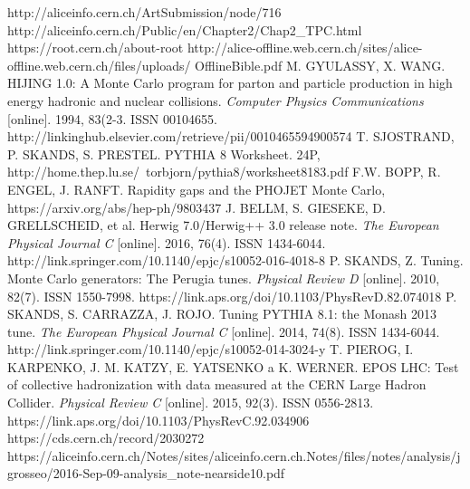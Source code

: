 \documentclass[thesismargins, thesislinespacing]{rnthesis}
\begin{document}
\begin{thebibliography}{}
http://aliceinfo.cern.ch/ArtSubmission/node/716
http://aliceinfo.cern.ch/Public/en/Chapter2/Chap2\_TPC.html
https://root.cern.ch/about-root 
http://alice-offline.web.cern.ch/sites/alice-offline.web.cern.ch/files/uploads/ \- OfflineBible.pdf
M. GYULASSY, X. WANG. HIJING 1.0: A Monte Carlo program for parton and particle production in high energy hadronic and nuclear collisions. \textit{Computer Physics Communications} [online]. 1994, 83(2-3. ISSN 00104655. http://linkinghub.elsevier.com/retrieve/pii/0010465594900574
T. SJOSTRAND, P. SKANDS, S. PRESTEL.  PYTHIA 8 Worksheet. 24P, http://home.thep.lu.se/~torbjorn/pythia8/worksheet8183.pdf
F.W. BOPP, R. ENGEL, J. RANFT.  Rapidity gaps and the PHOJET Monte Carlo, https://arxiv.org/abs/hep-ph/9803437
J. BELLM, S. GIESEKE, D. GRELLSCHEID, et al. Herwig 7.0/Herwig++ 3.0 release note. \textit{The European Physical Journal C} [online]. 2016, 76(4). ISSN 1434-6044. http://link.springer.com/10.1140/epjc/s10052-016-4018-8
P. SKANDS, Z. Tuning. Monte Carlo generators: The Perugia tunes. \textit{Physical Review D }[online]. 2010, 82(7). ISSN 1550-7998. https://link.aps.org/doi/10.1103/PhysRevD.82.074018
P. SKANDS, S. CARRAZZA, J. ROJO. Tuning PYTHIA 8.1: the Monash 2013 tune. \textit{The European Physical Journal C} [online]. 2014, 74(8). ISSN 1434-6044. http://link.springer.com/10.1140/epjc/s10052-014-3024-y
T. PIEROG, I. KARPENKO, J. M. KATZY, E. YATSENKO a K. WERNER. EPOS LHC: Test of collective hadronization with data measured at the CERN Large Hadron Collider. \textit{Physical Review C} [online]. 2015, 92(3). ISSN 0556-2813.
 https://link.aps.org/doi/10.1103/PhysRevC.92.034906
 https://cds.cern.ch/record/2030272
 https://aliceinfo.cern.ch/Notes/sites/aliceinfo.cern.ch.Notes/files/notes/analysis/jgrosseo/2016-Sep-09-analysis\_note-nearside10.pdf
\end{thebibliography}
%
\end{document}

